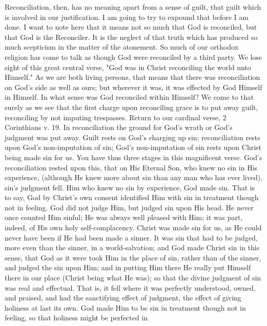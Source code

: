 \documentclass[draft]{ptfdoc}
\begin{document}
Reconciliation, then, has no meaning apart 
from a sense of guilt, that guilt which is involved 
in our justification. I am going to try to 
expound that before I am done. I want to note 
here that it means not so much that God is reconciled,
but that God is the Reconciler. It is the 
neglect of that truth which has produced so much 
scepticism in the matter of the atonement. So 
much of our orthodox religion has come to talk 
as though God were reconciled by a third party. 
We lose sight of this great central verse, 
"God was in Christ reconciling the world unto 
Himself." As we are both living persons, that 
means that there was reconciliation on God's 
side as well as ours; but wherever it was, it was 
effected by God Himself in Himself. In what 
sense was God reconciled within Himself? We 
come to that surely as we see that the first 
charge upon reconciling grace is to put away 
guilt, reconciling by not imputing trespasses. 
Return to our cardinal verse, 2 Corinthians 
v. 19. In reconciliation the ground for 
God's wrath or God's judgment was put away. 
Guilt rests on God's charging up sin; reconciliation 
rests upon God's non-imputation 
of sin; God's non-imputation of sin rests upon 
Christ being made sin for us. You have thus 
three stages in this magnificent verse. God's 
reconciliation rested upon this, that on His 
Eternal Son, who knew no sin in His experience, 
(although He knew more about sin than any 
man who has ever lived), sin's judgment fell. 
Him who knew no sin by experience, God made 
sin. That is to say, God by Christ's own consent 
identified Him with sin in treatment though 
not in feeling. God did not judge Him, but 
judged sin upon His head. He never once 
counted Him sinful; He was always well 
pleased with Him; it was part, indeed, of His 
own holy self-complacency. Christ was made sin 
for us, as He could never have been if He had 
been made a sinner. It was sin that had to be 
judged, more even than the sinner, in a world-salvation; 
and God made Christ sin in this sense, 
that God as it were took Him in the place of sin, 
rather than of the sinner, and judged the sin 
upon Him; and in putting Him there He really 
put Himself there in our place (Christ being 
what He was); so that the divine judgment of 
sin was real and effectual. That is, it fell where 
it was perfectly understood, owned, and praised, 
and had the sanctifying effect of judgment, the 
effect of giving holiness at last its own. God 
made Him to be sin in treatment though not 
in feeling, so that holiness might be perfected in 
\end{document}
